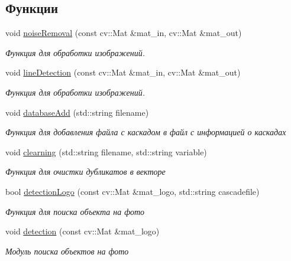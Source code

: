 \subsection*{Функции}
\begin{DoxyCompactItemize}
\item 
void \mbox{\hyperlink{group__coreh_ga438c92819ed0ad4fc2e187ed5f5a2e27}{noise\+Removal}} (const cv\+::\+Mat \&mat\+\_\+in, cv\+::\+Mat \&mat\+\_\+out)
\begin{DoxyCompactList}\small\item\em Функция для обработки изображений. \end{DoxyCompactList}\item 
void \mbox{\hyperlink{group__coreh_gaa7c37c22318217cd913a50800eb336a3}{line\+Detection}} (const cv\+::\+Mat \&mat\+\_\+in, cv\+::\+Mat \&mat\+\_\+out)
\begin{DoxyCompactList}\small\item\em Функция для обработки изображений. \end{DoxyCompactList}\item 
void \mbox{\hyperlink{group__coreh_ga5a4a30ca6128e13ce1ec6efaa23dd6c7}{database\+Add}} (std\+::string filename)
\begin{DoxyCompactList}\small\item\em Функция для добавления файла с каскадом в файл с информацией о каскадах \end{DoxyCompactList}\item 
void \mbox{\hyperlink{group__coreh_gaebd676a1476aa4d75b280db8ae09d11c}{clearning}} (std\+::string filename, std\+::string variable)
\begin{DoxyCompactList}\small\item\em Функция для очистки дубликатов в векторе \end{DoxyCompactList}\item 
bool \mbox{\hyperlink{group__coreh_gad1ae53e92ff9edcee7a9f35d2956ae57}{detection\+Logo}} (const cv\+::\+Mat \&mat\+\_\+logo, std\+::string cascadefile)
\begin{DoxyCompactList}\small\item\em Функция для поиска объекта на фото \end{DoxyCompactList}\item 
void \mbox{\hyperlink{group__coreh_ga0ef39a5ada0921b3abf8906957746b86}{detection}} (const cv\+::\+Mat \&mat\+\_\+logo)
\begin{DoxyCompactList}\small\item\em Модуль поиска объектов на фото \end{DoxyCompactList}\item 

\end{DoxyCompactItemize}
